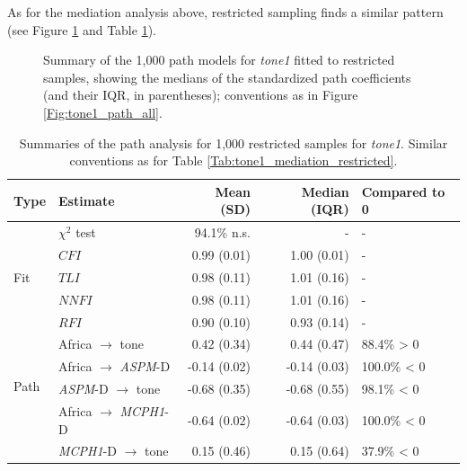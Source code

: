 \documentclass[twoside,onecolumn]{article}
\begin{document}
As for the mediation analysis above, restricted sampling finds a similar pattern (see Figure \ref{Fig:tone1_path_restricted} and Table \ref{Tab:tone1_path_restricted}).

\begin{figure}[h]
  \centering


  \caption{Summary of the 1,000 path models for \textit{tone1} fitted to restricted samples, showing the medians of the standardized path coefficients (and their IQR, in parentheses); conventions as in Figure \ref{Fig:tone1_path_all}. }
  \label{Fig:tone1_path_restricted}
\end{figure}

\begin{table}[h]
  \caption{Summaries of the path analysis for 1,000 restricted samples for \textit{tone1}. Similar conventions as for Table \ref{Tab:tone1_mediation_restricted}.}
  \label{Tab:tone1_path_restricted}
  \centering
  \begin{tabular}{|l|l|r|r|l|}
    \toprule
    \textbf{Type} & \textbf{Estimate} & \textbf{Mean (SD)} & \textbf{Median (IQR)} & \textbf{Compared to 0} \\
    \midrule
    \multirow{5}{*}{Fit} & $\chi^2$ test & 94.1\% n.s. & - & - \\
    & $CFI$  & 0.99 (0.01) & 1.00 (0.01) & - \\
    & $TLI$  & 0.98 (0.11) & 1.01 (0.16) & - \\
    & $NNFI$ & 0.98 (0.11) & 1.01 (0.16) & - \\
    & $RFI$  & 0.90 (0.10) & 0.93 (0.14) & - \\
    \midrule
    \multirow{4}{*}{Path} & Africa $\rightarrow$ tone & 0.42 (0.34) & 0.44 (0.47) & 88.4\% > 0 \\
    & Africa $\rightarrow$ \textit{ASPM}-D  & -0.14 (0.02) & -0.14 (0.03) & 100.0\% < 0 \\
    & \textit{ASPM}-D  $\rightarrow$ tone & -0.68 (0.35) & -0.68 (0.55) & 98.1\% < 0 \\
    & Africa $\rightarrow$ \textit{MCPH1}-D & -0.64 (0.02) & -0.64 (0.03) & 100.0\% < 0 \\
    & \textit{MCPH1}-D $\rightarrow$ tone &  0.15 (0.46) &  0.15 (0.64) & 37.9\% < 0 \\
    \bottomrule
  \end{tabular}
\end{table}
\end{document}
